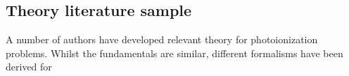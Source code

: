 \subsection{Theory literature sample\label{sec:theory-lit}}

A number of authors have developed relevant theory for photoionization problems. Whilst the fundamentals are similar, different formalisms have been derived for 